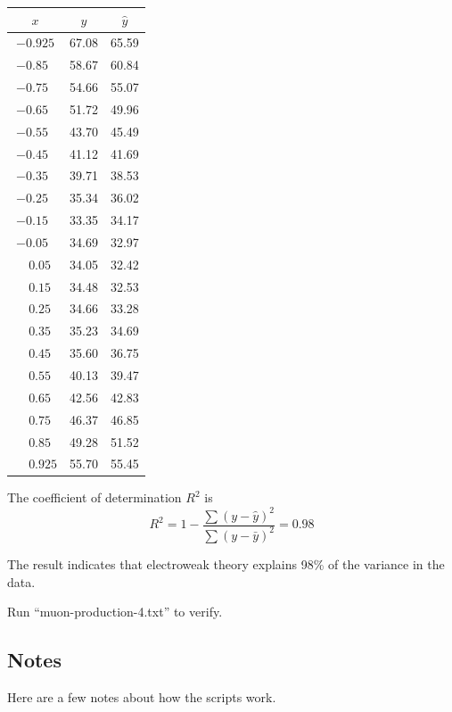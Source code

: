 \documentclass[12pt]{article}
\begin{document}
\begin{center}
\begin{tabular}{|c|c|c|}
\hline
$x$ & $y$ & $\hat{y}$ \\
\hline
$-0.925$ & 67.08 & 65.59\\
$-0.85\phantom{0}$ & 58.67 & 60.84\\
$-0.75\phantom{0}$ & 54.66 & 55.07\\
$-0.65\phantom{0}$ & 51.72 & 49.96\\
$-0.55\phantom{0}$ & 43.70 & 45.49\\
$-0.45\phantom{0}$ & 41.12 & 41.69\\
$-0.35\phantom{0}$ & 39.71 & 38.53\\
$-0.25\phantom{0}$ & 35.34 & 36.02\\
$-0.15\phantom{0}$ & 33.35 & 34.17\\
$-0.05\phantom{0}$ & 34.69 & 32.97\\
$\phantom{+}0.05\phantom{0}$ & 34.05 & 32.42\\
$\phantom{+}0.15\phantom{0}$ & 34.48 & 32.53\\
$\phantom{+}0.25\phantom{0}$ & 34.66 & 33.28\\
$\phantom{+}0.35\phantom{0}$ & 35.23 & 34.69\\
$\phantom{+}0.45\phantom{0}$ & 35.60 & 36.75\\
$\phantom{+}0.55\phantom{0}$ & 40.13 & 39.47\\
$\phantom{+}0.65\phantom{0}$ & 42.56 & 42.83\\
$\phantom{+}0.75\phantom{0}$ & 46.37 & 46.85\\
$\phantom{+}0.85\phantom{0}$ & 49.28 & 51.52\\
$\phantom{+}0.925$ & 55.70 & 55.45\\
\hline
\end{tabular}
\end{center}

\noindent
The coefficient of determination $R^2$ is
\begin{equation*}
R^2=1-\frac{\sum(y-\hat{y})^2}{\sum(y-\bar{y})^2}=0.98
\end{equation*}

\noindent
The result indicates that electroweak theory explains 98\% of the variance in the data.

\bigskip
\noindent
Run ``muon-production-4.txt'' to verify.

\subsection*{Notes}
Here are a few notes about how the scripts work.
\end{document}

